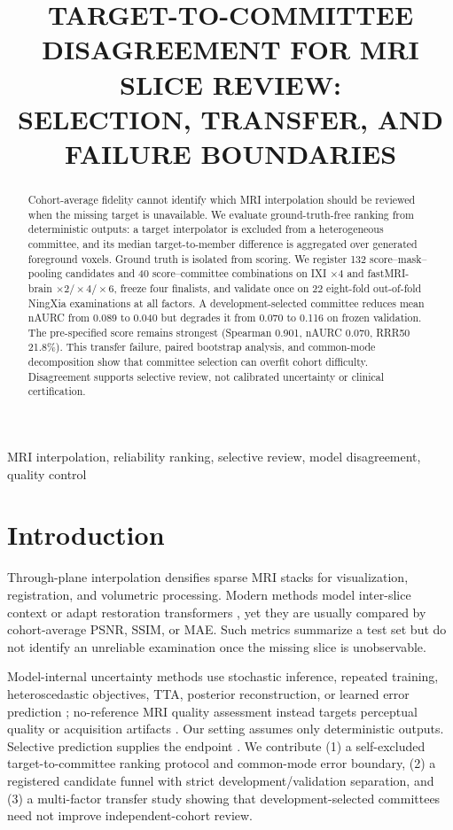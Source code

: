 \documentclass{article}
\title{TARGET-TO-COMMITTEE DISAGREEMENT FOR MRI SLICE REVIEW:\\
SELECTION, TRANSFER, AND FAILURE BOUNDARIES}
\begin{document}
\ninept
\maketitle

\begin{abstract}
Cohort-average fidelity cannot identify which MRI interpolation should be reviewed when the missing target is unavailable. We evaluate ground-truth-free ranking from deterministic outputs: a target interpolator is excluded from a heterogeneous committee, and its median target-to-member difference is aggregated over generated foreground voxels. Ground truth is isolated from scoring. We register 132 score--mask--pooling candidates and 40 score--committee combinations on IXI $\times4$ and fastMRI-brain $\times2/\times4/\times6$, freeze four finalists, and validate once on 22 eight-fold out-of-fold NingXia examinations at all factors. A development-selected committee reduces mean nAURC from 0.089 to 0.040 but degrades it from 0.070 to 0.116 on frozen validation. The pre-specified score remains strongest (Spearman 0.901, nAURC 0.070, RRR50 21.8\%). This transfer failure, paired bootstrap analysis, and common-mode decomposition show that committee selection can overfit cohort difficulty. Disagreement supports selective review, not calibrated uncertainty or clinical certification.
\end{abstract}

\begin{keywords}
MRI interpolation, reliability ranking, selective review, model disagreement, quality control
\end{keywords}

\section{Introduction}
Through-plane interpolation densifies sparse MRI stacks for visualization, registration, and volumetric processing. Modern methods model inter-slice context or adapt restoration transformers \cite{song2024i3net,liang2021swinir,chen2022hat}, yet they are usually compared by cohort-average PSNR, SSIM, or MAE. Such metrics summarize a test set but do not identify an unreliable examination once the missing slice is unobservable.

Model-internal uncertainty methods use stochastic inference, repeated training, heteroscedastic objectives, TTA, posterior reconstruction, or learned error prediction \cite{gal2016dropout,lakshminarayanan2017deepensembles,kendall2017uncertainties,wang2018tta,edupuganti2021uqmri,kuestner2024ensembles,shaw2020heteroscedastic,hu2021predict,zhang2024trainingfree}; no-reference MRI quality assessment instead targets perceptual quality or acquisition artifacts \cite{stepien2022nriqa}. Our setting assumes only deterministic outputs. Selective prediction supplies the endpoint \cite{elyaniv2010selective,geifman2019selectivenet,ding2020aurc,kompa2021second}. We contribute (1) a self-excluded target-to-committee ranking protocol and common-mode error boundary, (2) a registered candidate funnel with strict development/validation separation, and (3) a multi-factor transfer study showing that development-selected committees need not improve independent-cohort review.
\end{document}

